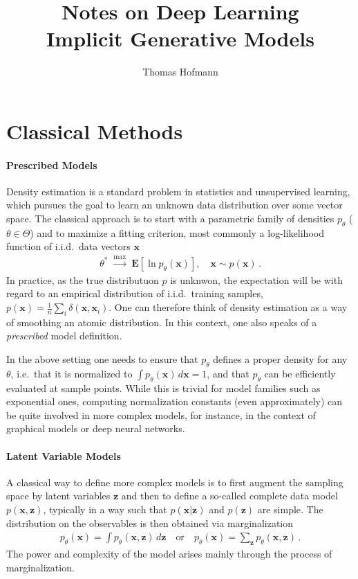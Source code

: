 \documentclass{article}
\title{
	{\large Notes on Deep Learning} \\[2mm]
	Implicit Generative Models 
}
\author{Thomas Hofmann}
\newcommand{\E}{{\mathbf E}}
\newcommand{\x}{{\mathbf x}}
\newcommand{\z}{{\mathbf z}}
\begin{document}
\maketitle 

\section{Classical Methods} 

\paragraph{Prescribed Models}  Density estimation is a standard problem in statistics and unsupervised learning, which pursues the goal to learn an unknown data distribution over some vector space. The classical  approach is to start with a parametric family of densities $p_\theta$ ($\theta \in \Theta$) and to maximize a fitting criterion, most commonly a log-likelihood function of i.i.d.~data vectors $\x$
\begin{align}
\theta^* \; \stackrel{\max}{\longrightarrow} \; \E[\ln p_\theta(\x)], \quad \x \sim p(\x)\,.
\end{align}
In practice, as the true distributuon $p$ is unknwon, the expectation will be with regard to an empirical distribution of i.i.d.~training samples, $p(\x) = \frac 1n \sum_i \delta(\x,\x_i)$. One can therefore think of density estimation as a way of smoothing an atomic distribution. In this context, one also speaks of a \textit{prescribed} model definition. 

In the above setting one needs to ensure that $p_\theta$ defines a proper density for any $\theta$, i.e.~that it is normalized to $\int p_\theta(\x) \, d\x=1$, and that $p_\theta$ can be efficiently evaluated at sample points. While this is trivial for model families such as exponential ones,  computing normalization constants (even approximately) can be quite involved in more complex models, for instance, in the context of graphical models or deep neural networks. 

\paragraph{Latent Variable Models}  A classical way to define more complex models is to first augment the sampling space by latent variables $\z$ and then to define a so-called complete data model $p(\x,\z)$, typically in a way such that $p(\x|\z)$ and $p(\z)$ are simple. The distribution on the observables is then obtained via marginalization
\begin{align}
p_\theta(\x) = \int p_\theta(\x,\z) \, d\z \quad \text{or}\quad 
p_\theta(\x) = \sum_\z p_\theta(\x,\z)\,.
\end{align}
The power and complexity of the model arises mainly through the process of marginalization. 
\end{document}
